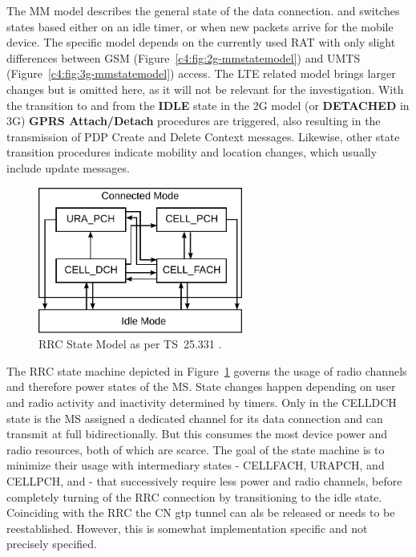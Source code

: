 The \gls{MM} model \cite[Section~6.1]{3gpp.23.060} describes the general state of the data connection. and switches states based either on an idle timer, or when new packets arrive for the mobile device. The specific model depends on the currently used \gls{RAT} with only slight differences between \gls{GSM} (Figure~\ref{c4:fig:2g-mmstatemodel}) and \gls{UMTS} (Figure~\ref{c4:fig:3g-mmstatemodel}) access. The \gls{LTE} related model brings larger changes but is omitted here, as it will not be relevant for the investigation. With the transition to and from the \textbf{IDLE} state in the \gls{2G} model (or \textbf{DETACHED} in \gls{3G}) \textbf{GPRS Attach/Detach} procedures are triggered, also resulting in the transmission of \gls{PDP} Create and Delete Context messages. Likewise, other state transition procedures indicate mobility and location changes, which usually include update messages.

\begin{figure}[htb] 
	\centering
	\includegraphics[width=0.6\textwidth]{images/rrc-state-model.pdf}
	\caption{\gls{RRC} State Model as per \gls{TS}~25.331 \cite[Section~7.1]{3gpp.25.331}.}
	\label{c4:fig:rrcstatemodel}
\end{figure}

 The \gls{RRC} state machine \cite[Section~7.1]{3gpp.25.331} depicted in Figure~\ref{c4:fig:rrcstatemodel} governs the usage of radio channels and therefore power states of the \gls{MS}. State changes happen depending on user and radio activity and inactivity determined by timers. Only in the \gls{CELLDCH} state is the \gls{MS} assigned a dedicated channel for its data connection and can transmit at full bidirectionally. But this consumes the most device power and radio resources, both of which are scarce. The goal of the state machine is to minimize their usage with intermediary states - \gls{CELLFACH}, \gls{URAPCH}, and \gls{CELLPCH}, and  - that successively require less power and radio channels, before completely turning of the \gls{RRC} connection by transitioning to the idle state. Coinciding with the \gls{RRC} the \gls{CN} \gls{gtp} tunnel can als be released or needs to be reestablished. However, this is somewhat implementation specific and not precisely specified.

